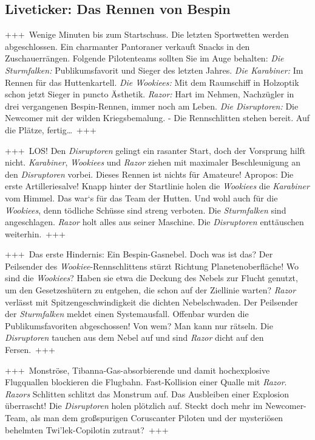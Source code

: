 \documentclass[final]{multiversum}
\begin{document}
\subsection{Liveticker: Das Rennen von Bespin}
+++~Wenige Minuten bis zum Startschuss.
    Die letzten Sportwetten werden abgeschlossen.
    Ein charmanter Pantoraner verkauft Snacks in den Zuschauerrängen.
    Folgende Pilotenteams sollten Sie im Auge behalten:
    \textit{Die Sturmfalken:} Publikumsfavorit und Sieger des letzten Jahres.
    \textit{Die Karabiner:} Im Rennen für das Huttenkartell.
    \textit{Die Wookiees:} Mit dem Raumschiff in Holzoptik schon jetzt Sieger in puncto Ästhetik.
    \textit{Razor:} Hart im Nehmen, Nachzügler in drei vergangenen Bespin-Rennen, immer noch am Leben.
    \textit{Die Disruptoren:} Die Newcomer mit der wilden Kriegsbemalung.
    - Die Rennschlitten stehen bereit.
    Auf die Plätze, fertig…~+++

+++~LOS!
    Den \textit{Disruptoren} gelingt ein rasanter Start, doch der Vorsprung hilft nicht.
    \textit{Karabiner}, \textit{Wookiees} und \textit{Razor} ziehen mit maximaler Beschleunigung an den \textit{Disruptoren} vorbei.
    Dieses Rennen ist nichts für Amateure!
    Apropos: Die erste Artilleriesalve!
    Knapp hinter der Startlinie holen die \textit{Wookiees} die \textit{Karabiner} vom Himmel.
    Das war‘s für das Team der Hutten.
    Und wohl auch für die \textit{Wookiees}, denn tödliche Schüsse sind streng verboten.
    Die \textit{Sturmfalken} sind angeschlagen.
    \textit{Razor} holt alles aus seiner Maschine.
    Die \textit{Disruptoren} enttäuschen weiterhin.~+++

+++~Das erste Hindernis: Ein Bespin-Gasnebel.
    Doch was ist das?
    Der Peilsender des \textit{Wookiee}-Rennschlittens stürzt Richtung Planetenoberfläche!
    Wo sind die \textit{Wookiees}?
    Haben sie etwa die Deckung des Nebels zur Flucht genutzt, um den Gesetzeshütern zu entgehen, die schon auf der Ziellinie warten?
    \textit{Razor} verlässt mit Spitzengeschwindigkeit die dichten Nebelschwaden.
    Der Peilsender der \textit{Sturmfalken} meldet einen Systemausfall.
    Offenbar wurden die Publikumsfavoriten abgeschossen!
    Von wem?
    Man kann nur rätseln.
    Die \textit{Disruptoren} tauchen aus dem Nebel auf und sind \textit{Razor} dicht auf den Fersen.~+++

+++~Monströse, Tibanna-Gas-absorbierende und damit hochexplosive Flugquallen blockieren die Flugbahn.
    Fast-Kollision einer Qualle mit \textit{Razor}.
    \textit{Razors} Schlitten schlitzt das Monstrum auf.
    Das Ausbleiben einer Explosion überrascht! Die \textit{Disruptoren} holen plötzlich auf.
    Steckt doch mehr im Newcomer-Team, als man dem großspurigen Coruscanter Piloten und der mysteriösen behelmten Twi’lek-Copilotin zutraut?~+++
\end{document}
